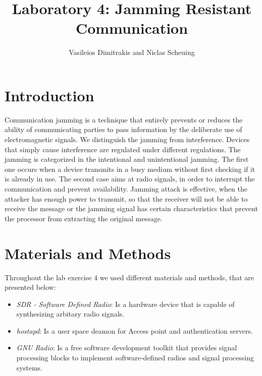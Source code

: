\documentclass[12pt,a4paper]{article}
\title{Laboratory 4: Jamming Resistant Communication}
\author{Vasileios Dimitrakis and Niclas Scheuing}
\begin{document}
\maketitle

\section{Introduction}

Communication jamming is a technique that entirely prevents or reduces the ability of communicating parties to pass information by the deliberate use of electromagnetic signals. We distinguish the jamming from interference. Devices that simply cause interference are regulated under different regulations.
The jamming is categorized in the intentional and unintentional jamming. The first one occurs when a device transmits in a busy medium without first checking if it is already in use. The second case aims at radio signals, in order to interrupt the communication and prevent availability.
Jamming attack is effective, when the attacker has enough power to transmit, so that the receiver will not be able to receive the message or the jamming signal has certain characteristics that prevent the processor from extracting the original message.

\section{Materials and Methods}
Throughout the lab exercise 4 we used different materials and methods, that are presented below:
\begin{itemize}
\item \emph{SDR - Software Defined Radio}: Is a hardware device that is capable of synthesizing arbitary radio signals.
\item \emph{hostapd}: Is a user space deamon for Access point and authentication servers.
\item \emph{GNU Radio}: Is a free software development toolkit that provides signal processing blocks to implement software-defined radios and signal processing systems. 
\end{itemize}
\end{document}
